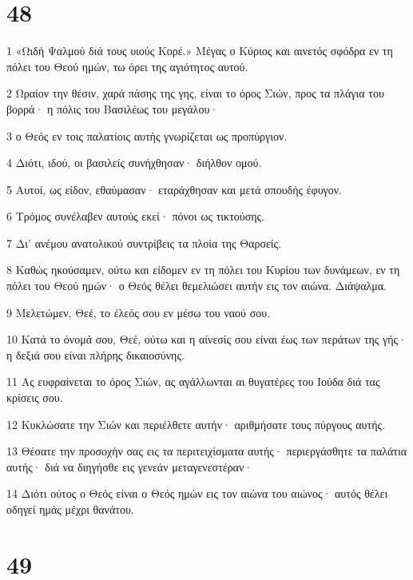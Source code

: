 \chapter{48}

\par 1 «Ωιδή Ψαλμού διά τους υιούς Κορέ.» Μέγας ο Κύριος και αινετός σφόδρα εν τη πόλει του Θεού ημών, τω όρει της αγιότητος αυτού.
\par 2 Ωραίον την θέσιν, χαρά πάσης της γης, είναι το όρος Σιών, προς τα πλάγια του βορρά· η πόλις του Βασιλέως του μεγάλου·
\par 3 ο Θεός εν τοις παλατίοις αυτής γνωρίζεται ως προπύργιον.
\par 4 Διότι, ιδού, οι βασιλείς συνήχθησαν· διήλθον ομού.
\par 5 Αυτοί, ως είδον, εθαύμασαν· εταράχθησαν και μετά σπουδής έφυγον.
\par 6 Τρόμος συνέλαβεν αυτούς εκεί· πόνοι ως τικτούσης.
\par 7 Δι' ανέμου ανατολικού συντρίβεις τα πλοία της Θαρσείς.
\par 8 Καθώς ηκούσαμεν, ούτω και είδομεν εν τη πόλει του Κυρίου των δυνάμεων, εν τη πόλει του Θεού ημών· ο Θεός θέλει θεμελιώσει αυτήν εις τον αιώνα. Διάψαλμα.
\par 9 Μελετώμεν, Θεέ, το έλεός σου εν μέσω του ναού σου.
\par 10 Κατά το όνομά σου, Θεέ, ούτω και η αίνεσίς σου είναι έως των περάτων της γής· η δεξιά σου είναι πλήρης δικαιοσύνης.
\par 11 Ας ευφραίνεται το όρος Σιών, ας αγάλλωνται αι θυγατέρες του Ιούδα διά τας κρίσεις σου.
\par 12 Κυκλώσατε την Σιών και περιέλθετε αυτήν· αριθμήσατε τους πύργους αυτής.
\par 13 Θέσατε την προσοχήν σας εις τα περιτειχίσματα αυτής· περιεργάσθητε τα παλάτια αυτής· διά να διηγήσθε εις γενεάν μεταγενεστέραν·
\par 14 Διότι ούτος ο Θεός είναι ο Θεός ημών εις τον αιώνα του αιώνος· αυτός θέλει οδηγεί ημάς μέχρι θανάτου.

\chapter{49}

